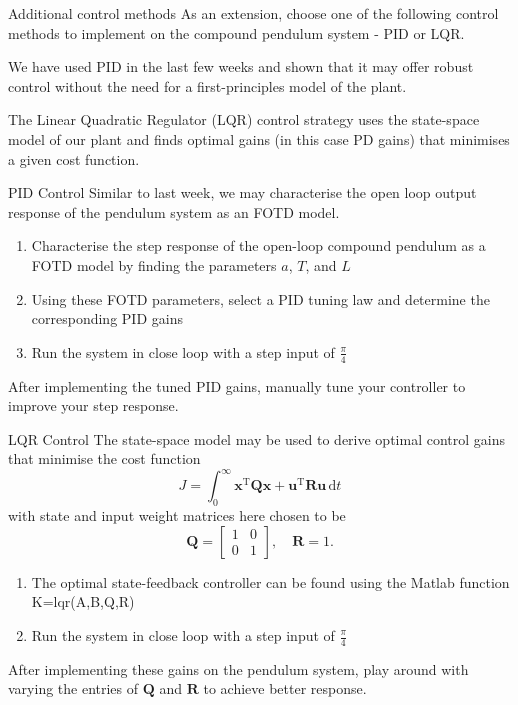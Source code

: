 \documentclass[9pt]{beamer-control}
\begin{document}
\begin{frame}{Additional control methods}
As an extension, choose one of the following control methods to implement on the compound pendulum system - PID or LQR.

We have used PID in the last few weeks and shown that it may offer robust control without the need for a first-principles model of the plant.

The Linear Quadratic Regulator (LQR) control strategy uses the state-space model of our plant and finds optimal gains (in this case PD gains) that minimises a given cost function.
\end{frame}

\begin{frame}{PID Control}
Similar to last week, we may characterise the open loop output response of the pendulum system as an FOTD model.

\begin{enumerate}
	\item Characterise the step response of the open-loop compound pendulum as a FOTD model by finding the parameters $a$, $T$, and $L$
	\item Using these FOTD parameters, select a PID tuning law and determine the corresponding PID gains
	\item Run the system in close loop with a step input of $\tfrac{\pi}{4}$
	
\end{enumerate}

After implementing the tuned PID gains, manually tune your controller to improve your step response.

\end{frame}


\begin{frame}{LQR Control}
The state-space model may be used to derive optimal control gains that minimise the cost function
\[J = \int^\infty _0 \mathbf{x}^\mathrm{T} \mathbf{Q} \mathbf{x} + \mathbf{u}^\mathrm{T} \mathbf{R} \mathbf{u}  \, \mathrm{d} t\]
with state and input weight matrices here chosen to be 
\[ \mathbf{Q} = \begin{bmatrix}
	1 & 0 \\ 0 & 1
\end{bmatrix}, \quad \mathbf{R} = 1 .\]

\begin{enumerate}
	\item The optimal state-feedback controller can be found using the Matlab function K=lqr(A,B,Q,R)
	\item Run the system in close loop with a step input of $\tfrac{\pi}{4}$
\end{enumerate}

After implementing these gains on the pendulum system, play around with varying the entries of $\mathbf{Q}$ and $\mathbf{R}$ to achieve better response.
\end{frame}
\end{document}
